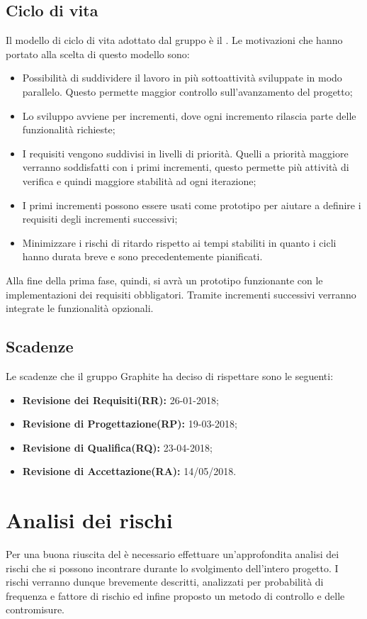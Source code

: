 \documentclass[./PianodiProgetto.tex]{subfiles}
\begin{document}
\section{Ciclo di vita}

Il modello di ciclo di vita adottato dal gruppo è il . Le motivazioni che hanno portato alla scelta di questo modello sono:
\begin{itemize}
	\item Possibilità di suddividere il lavoro in più sottoattività sviluppate in modo parallelo. Questo permette maggior controllo sull’avanzamento del progetto;
	\item Lo sviluppo avviene per incrementi, dove ogni incremento rilascia parte delle funzionalità richieste;
	\item I requisiti vengono suddivisi in livelli di priorità. Quelli a priorità maggiore verranno soddisfatti con i primi incrementi, questo permette più attività di verifica e quindi maggiore stabilità ad ogni iterazione;
	\item I primi incrementi possono essere usati come prototipo per aiutare a definire i requisiti degli incrementi successivi;
	\item Minimizzare i rischi di ritardo rispetto ai tempi stabiliti in quanto i cicli hanno durata breve e sono precedentemente pianificati.
\end{itemize}
Alla fine della prima fase, quindi, si avrà un prototipo funzionante con le implementazioni dei requisiti obbligatori. Tramite incrementi successivi verranno integrate le funzionalità opzionali.

\section{Scadenze}
Le scadenze che il gruppo Graphite ha deciso di rispettare sono le seguenti:
\begin{itemize}
	\item \textbf{Revisione dei Requisiti(RR):} 26-01-2018;
	\item \textbf{Revisione di Progettazione(RP):} 19-03-2018;
	\item \textbf{Revisione di Qualifica(RQ):} 23-04-2018;
	\item \textbf{Revisione di Accettazione(RA):} 14/05/2018.
\end{itemize}

\chapter{Analisi dei rischi}
Per una buona riuscita del  è necessario effettuare un'approfondita analisi dei rischi che si possono incontrare durante lo svolgimento dell'intero progetto. I rischi verranno dunque brevemente descritti, analizzati per probabilità di frequenza e fattore di rischio ed infine proposto un metodo di controllo e delle contromisure.
\end{document}
